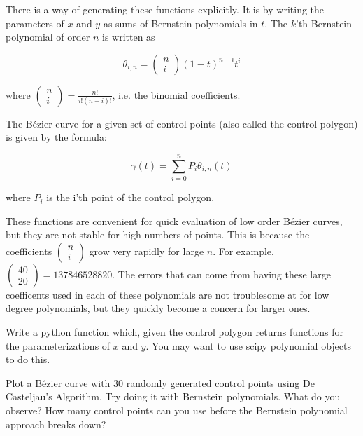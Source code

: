 There is a way of generating these functions explicitly. 
It is by writing the parameters of $x$ and $y$ as sums of Bernstein polynomials in $t$. 
The $k$'th Bernstein polynomial of order $n$ is written as 

$$\theta_{i,n}=\left( \begin{smallmatrix} n\\ i \end{smallmatrix} \right) (1-t)^{n-i} t^i$$

where $\left( \begin{smallmatrix} n\\ i \end{smallmatrix} \right) = \frac{n!}{i!(n-i)!}$, i.e. the binomial coefficients.

The B\'{e}zier curve for a given set of control points (also called the control polygon) is given by the formula:

$$\gamma (t) = \sum_{i=0}^n P_i \theta_{i,n} (t)$$ 

where $P_i$ is the i'th point of the control polygon.

These functions are convenient for quick evaluation of low order B\'{e}zier curves, but they are not stable for high numbers of points. 
This is because the coefficients $\left( \begin{smallmatrix} n\\ i \end{smallmatrix} \right)$ grow very rapidly for large $n$. 
For example, $\left( \begin{smallmatrix} 40\\ 20 \end{smallmatrix} \right)=137846528820$. 
The errors that can come from having these large coefficents used in each of these polynomials are not troublesome at for low degree polynomials, but they quickly become a concern for larger ones. 

\begin{problem}
Write a python function which, given the control polygon returns functions for the parameterizations of $x$ and $y$. 
You may want to use scipy polynomial objects to do this.
\end{problem}

\begin{problem}
Plot a B\'{e}zier curve with 30 randomly generated control points using De Casteljau's Algorithm. 
Try doing it with Bernstein polynomials. 
What do you observe? 
How many control points can you use before the Bernstein polynomial approach breaks down?
\end{problem}

